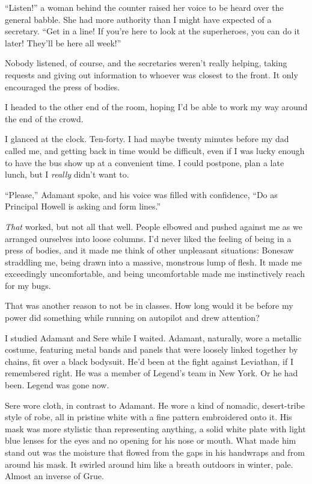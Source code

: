 ``Listen!''  a woman behind the counter raised her voice to be heard over the general babble.  She had more authority than I might have expected of a secretary.  ``Get in a line! If you're here to look at the superheroes, you can do it later!  They'll be here all week!''



Nobody listened, of course, and the secretaries weren't really helping, taking requests and giving out information to whoever was closest to the front.  It only encouraged the press of bodies.



I headed to the other end of the room, hoping I'd be able to work my way around the end of the crowd.



I glanced at the clock.  Ten-forty.  I had maybe twenty minutes before my dad called me, and getting back in time would be difficult, even if I was lucky enough to have the bus show up at a convenient time.  I could postpone, plan a late lunch, but I \emph{really} didn't want to.



``Please,'' Adamant spoke, and his voice was filled with confidence, ``Do as Principal Howell is asking and form lines.''



\emph{That} worked, but not all that well.  People elbowed and pushed against me as we arranged ourselves into loose columns.  I'd never liked the feeling of being in a press of bodies, and it made me think of other unpleasant situations: Bonesaw straddling me, being drawn into a massive, monstrous lump of flesh.  It made me exceedingly uncomfortable, and being uncomfortable made me instinctively reach for my bugs.



That was another reason to not be in classes.  How long would it be before my power did something while running on autopilot and drew attention?



I studied Adamant and Sere while I waited.  Adamant, naturally, wore a metallic costume, featuring metal bands and panels that were loosely linked together by chains, fit over a black bodysuit.  He'd been at the fight against Leviathan, if I remembered right.  He was a member of Legend's team in New York.  Or he had been.  Legend was gone now.



Sere wore cloth, in contrast to Adamant.  He wore a kind of nomadic, desert-tribe style of robe, all in pristine white with a fine pattern embroidered onto it.  His mask was more stylistic than representing anything, a solid white plate with light blue lenses for the eyes and no opening for his nose or mouth.  What made him stand out was the moisture that flowed from the gaps in his handwraps and from around his mask.  It swirled around him like a breath outdoors in winter, pale.  Almost an inverse of Grue.



